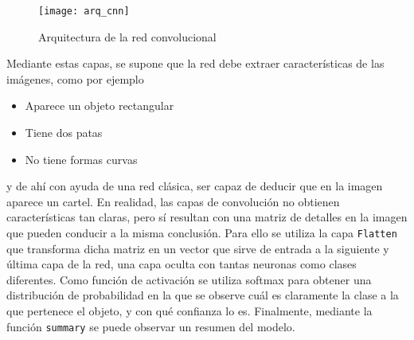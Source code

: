 			\begin{figure}[!h]
				\centering
				\texttt{[image: arq\_cnn]}
				\caption{Arquitectura de la red convolucional}
				\label{fig:arq_cnn}
			\end{figure}
			
			Mediante estas capas, se supone que la red debe extraer características de las imágenes, como por ejemplo
			
			\begin{itemize}
				\item Aparece un objeto rectangular
				\item Tiene dos patas 
				\item No tiene formas curvas
			\end{itemize}
			y de ahí con ayuda de una red clásica, ser capaz de deducir que en la imagen aparece un cartel. En realidad, las capas de convolución no obtienen características tan claras, pero sí resultan con una matriz de detalles en la imagen que pueden conducir a la misma conclusión. Para ello se utiliza la capa \texttt{Flatten} que transforma dicha matriz en un vector que sirve de entrada a la siguiente y última capa de la red, una capa oculta con tantas neuronas como clases diferentes. Como función de activación se utiliza softmax para obtener una distribución de probabilidad en la que se observe cuál es claramente la clase a la que pertenece el objeto, y con qué confianza lo es. Finalmente, mediante la función \texttt{summary} se puede observar un resumen del modelo. 
			
